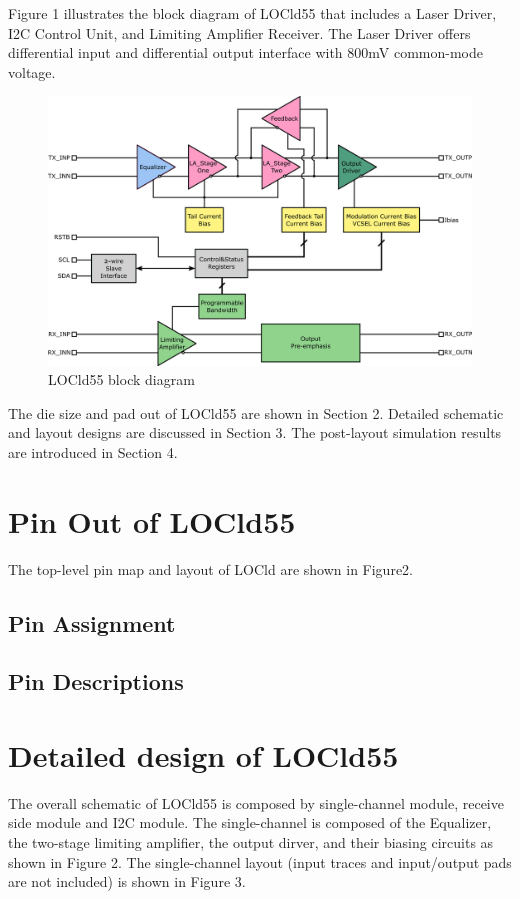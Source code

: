 \documentclass[11pt,a4paper]{article}
\begin{document}
\begin{spacing}{1.25}
Figure 1 illustrates the block diagram of LOCld55 that includes a Laser Driver, I2C Control Unit, and Limiting Amplifier Receiver. The Laser Driver offers differential input and differential output interface with 800mV common-mode voltage.

\begin{figure}[H]
    \includegraphics[width=\linewidth]{./Img/locld55.png}
    \caption{LOCld55 block diagram}
\end{figure}

The die size and pad out of LOCld55 are shown in Section 2. Detailed schematic and layout designs are discussed in Section 3. The post-layout simulation results are introduced in Section 4.

\section{Pin Out of LOCld55}                %
The top-level pin map and layout of LOCld are shown in Figure2.

\subsection{Pin Assignment}

\subsection{Pin Descriptions}

\section{Detailed design of LOCld55}        %
The overall schematic of LOCld55 is composed by single-channel module, receive side module and I2C module. The single-channel is composed of the Equalizer, the two-stage limiting amplifier, the output dirver, and their biasing circuits as shown in Figure 2. The single-channel layout (input traces and input/output pads are not included) is shown in Figure 3.


\end{spacing}
\end{document}
